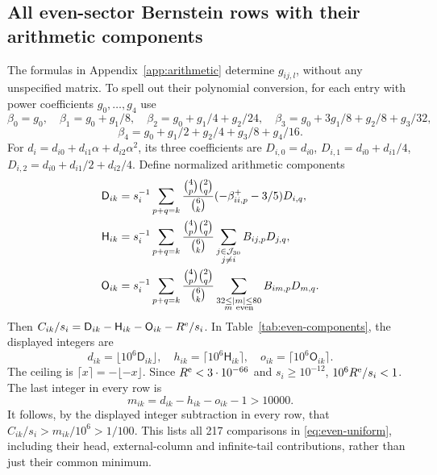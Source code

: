 \subsection{All even-sector Bernstein rows with their arithmetic components}
The formulas in Appendix~\ref{app:arithmetic} determine $g_{ij,l}$, without
any unspecified matrix. To spell out their polynomial conversion, for each
entry with power coefficients $g_0,\ldots,g_4$ use
\[
 \beta_0=g_0,\quad \beta_1=g_0+g_1/8,\quad
 \beta_2=g_0+g_1/4+g_2/24,\quad
 \beta_3=g_0+3g_1/8+g_2/8+g_3/32,
\]
\[
 \beta_4=g_0+g_1/2+g_2/4+g_3/8+g_4/16.
\]
For $d_i=d_{i0}+d_{i1}\alpha+d_{i2}\alpha^2$, its three coefficients are
$D_{i,0}=d_{i0}$, $D_{i,1}=d_{i0}+d_{i1}/4$,
$D_{i,2}=d_{i0}+d_{i1}/2+d_{i2}/4$.
Define normalized arithmetic components
\begin{align*}
 \mathsf D_{ik}&=s_i^{-1}\sum_{p+q=k}
 \frac{\binom4p\binom2q}{\binom6k}(-\beta^+_{ii,p}-3/5)D_{i,q},\\
 \mathsf H_{ik}&=s_i^{-1}\sum_{p+q=k}
 \frac{\binom4p\binom2q}{\binom6k}
 \sum_{\substack{j\in\mathcal J_{30}\\j\ne i}}B_{ij,p}D_{j,q},\\
 \mathsf O_{ik}&=s_i^{-1}\sum_{p+q=k}
 \frac{\binom4p\binom2q}{\binom6k}
 \sum_{\substack{32\le|m|\le80\\m\ {\rm even}}}B_{im,p}D_{m,q}.
\end{align*}
Then $C_{ik}/s_i=\mathsf D_{ik}-\mathsf H_{ik}-\mathsf O_{ik}-R^{\rm e}/s_i$.
In Table~\ref{tab:even-components}, the displayed integers are
\[
 d_{ik}=\lfloor10^6\mathsf D_{ik}\rfloor,\quad
 h_{ik}=\lceil10^6\mathsf H_{ik}\rceil,\quad
 o_{ik}=\lceil10^6\mathsf O_{ik}\rceil.
\]
The ceiling is $\lceil x\rceil=-\lfloor-x\rfloor$. Since
$R^{\rm e}<3\cdot10^{-66}$ and $s_i\ge10^{-12}$,
$10^6R^{\rm e}/s_i<1$. The last integer in every row is
\[
 m_{ik}=d_{ik}-h_{ik}-o_{ik}-1>10000.
\]
It follows, by the displayed integer subtraction in every row, that
$C_{ik}/s_i>m_{ik}/10^6>1/100$. This lists all 217 comparisons in
\eqref{eq:even-uniform}, including their head, external-column and infinite-tail
contributions, rather than just their common minimum.

